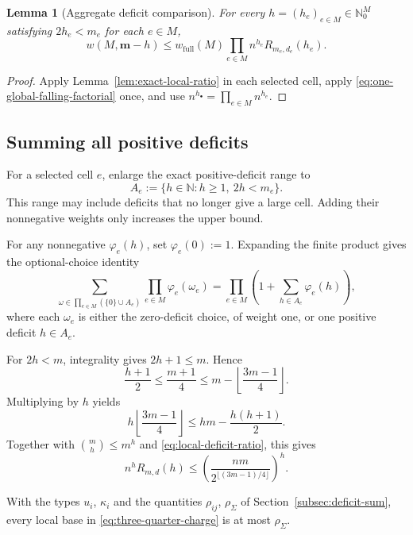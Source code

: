 \documentclass[a4paper,10pt,reqno]{amsart}
\numberwithin{equation}{section}
\theoremstyle{plain}
\newtheorem{lemma}[theorem]{Lemma}
\theoremstyle{remark}
\begin{document}
\begin{lemma}[Aggregate deficit comparison]
\label{lem:aggregate-deficit-comparison}
For every $h=(h_e)_{e\in M}\in\mathbb N_0^M$ satisfying
$2h_e<m_e$ for each $e\in M$,
\begin{equation}
  w(M,\mathbf m-h)
  \le
  w_{\mathrm{full}}(M)
  \prod_{e\in M}n^{h_e}R_{m_e,d_e}(h_e).
  \label{eq:aggregate-deficit-comparison}
\end{equation}
\end{lemma}

\begin{proof}
Apply Lemma~\ref{lem:exact-local-ratio} in each selected cell, apply
\eqref{eq:one-global-falling-factorial} once, and use
$n^{h_\bullet}=\prod_{e\in M}n^{h_e}$.
\end{proof}

\subsection{Summing all positive deficits}
\label{app:deficit-sum}

For a selected cell $e$, enlarge the exact positive-deficit range to
\[
  A_e:=\{h\in\mathbb N:h\ge1,\ 2h<m_e\}.
\]
This range may include deficits that no longer give a large cell. Adding
their nonnegative weights only increases the upper bound.

For any nonnegative $\varphi_e(h)$, set $\varphi_e(0):=1$. Expanding the
finite product gives the optional-choice identity
\[
  \sum_{\omega\in\prod_{e\in M}(\{0\}\cup A_e)}
    \prod_{e\in M}\varphi_e(\omega_e)
  =
  \prod_{e\in M}
    \left(1+\sum_{h\in A_e}\varphi_e(h)\right),
\]
where each $\omega_e$ is either the zero-deficit choice, of weight one, or one
positive deficit $h\in A_e$.

For $2h<m$, integrality gives $2h+1\le m$. Hence
\[
  \frac{h+1}{2}
  \le
  \frac{m+1}{4}
  \le
  m-\left\lfloor\frac{3m-1}{4}\right\rfloor.
\]
Multiplying by $h$ yields
\begin{equation}
  h\left\lfloor\frac{3m-1}{4}\right\rfloor
  \le
  hm-\frac{h(h+1)}2.
  \label{eq:three-quarter-budget}
\end{equation}
Together with $\binom mh\le m^h$ and
\eqref{eq:local-deficit-ratio}, this gives
\begin{equation}
  n^hR_{m,d}(h)
  \le
  \left(
    \frac{nm}{2^{\lfloor(3m-1)/4\rfloor}}
  \right)^h.
  \label{eq:three-quarter-charge}
\end{equation}

With the types $u_i$, $\kappa_i$ and the quantities $\rho_{ij}$,
$\rho_\Sigma$ of Section~\ref{subsec:deficit-sum}, every local base in
\eqref{eq:three-quarter-charge} is at most $\rho_{\Sigma}$.
\end{document}
